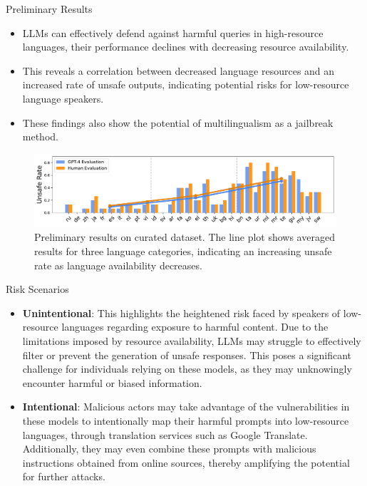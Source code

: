 \begin{frame}{Preliminary Results}
    \begin{itemize}
        \item LLMs can effectively defend against harmful queries in high-resource languages, their performance declines with decreasing resource availability.
        \item This reveals a correlation between decreased language resources and an increased rate of unsafe outputs, indicating potential risks for low-resource language speakers.
        \item These findings also show the potential of multilingualism as a jailbreak method.
    \end{itemize}
    \begin{figure}
            \centering
            \includegraphics[width=\linewidth]{pic/preliminary_combine}
            \caption{Preliminary results on curated dataset. The line plot shows averaged results for three language categories, indicating an increasing unsafe rate as language availability decreases.}
            \label{fig:prelim_results}
        \end{figure}
\end{frame}

\begin{frame}{Risk Scenarios}
    \begin{itemize}
        \item \textbf{Unintentional}: This highlights the heightened risk faced by speakers of low-resource languages regarding exposure to harmful content. Due to the limitations imposed by resource availability, LLMs may struggle to effectively filter or prevent the generation of unsafe responses. This poses a significant challenge for individuals relying on these models, as they may unknowingly encounter harmful or biased information.
        \item \textbf{Intentional}: Malicious actors may take advantage of the vulnerabilities in these models to intentionally map their harmful prompts into low-resource languages, through translation services such as Google Translate. Additionally, they may even combine these prompts with malicious instructions obtained from online sources, thereby amplifying the potential for further attacks.
    \end{itemize}
\end{frame}